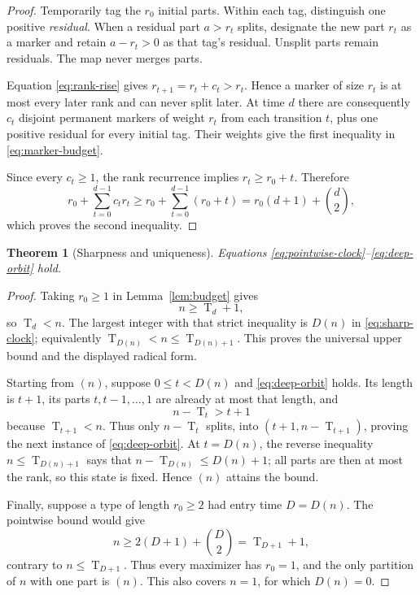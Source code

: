 \documentclass[10pt,a4paper]{amsart}
\newtheorem{theorem}{Theorem}[section]
\theoremstyle{definition}
\theoremstyle{remark}
\newcommand{\T}{\operatorname T}
\begin{document}
\begin{proof}
Temporarily tag the $r_0$ initial parts.  Within each tag, distinguish one
positive \emph{residual}.  When a residual part $a>r_t$ splits, designate
the new part $r_t$ as a marker and retain $a-r_t>0$ as that tag's residual.
Unsplit parts remain residuals.  The map never merges parts.

Equation \eqref{eq:rank-rise} gives
$r_{t+1}=r_t+c_t>r_t$.  Hence a marker of size $r_t$ is at most every later
rank and can never split later.  At time $d$ there are consequently $c_t$
disjoint permanent markers of weight $r_t$ from each transition $t$, plus
one positive residual for every initial tag.  Their weights give the first
inequality in \eqref{eq:marker-budget}.

Since every $c_t\geq1$, the rank recurrence implies $r_t\geq r_0+t$.
Therefore
\[
 r_0+\sum_{t=0}^{d-1}c_tr_t
 \geq r_0+\sum_{t=0}^{d-1}(r_0+t)
 =r_0(d+1)+\binom d2,
\]
which proves the second inequality.
\end{proof}

\begin{theorem}[Sharpness and uniqueness]\label{thm:clock}
Equations \eqref{eq:pointwise-clock}--\eqref{eq:deep-orbit} hold.
\end{theorem}

\begin{proof}
Taking $r_0\geq1$ in Lemma~\ref{lem:budget} gives
\[
                              n\geq\T_d+1,
\]
so $\T_d<n$.  The largest integer with that strict inequality is
$D(n)$ in \eqref{eq:sharp-clock}; equivalently
$\T_{D(n)}<n\leq\T_{D(n)+1}$.  This proves the universal upper bound and the
displayed radical form.

Starting from $(n)$, suppose $0\leq t<D(n)$ and
\eqref{eq:deep-orbit} holds.  Its length is $t+1$, its parts
$t,t-1,\ldots,1$ are already at most that length, and
\[
                         n-\T_t>t+1
\]
because $\T_{t+1}<n$.  Thus only $n-\T_t$ splits, into
$(t+1,n-\T_{t+1})$, proving the next instance of
\eqref{eq:deep-orbit}.  At $t=D(n)$, the reverse inequality
$n\leq\T_{D(n)+1}$ says that $n-\T_{D(n)}\leq D(n)+1$; all parts are then
at most the rank, so this state is fixed.  Hence $(n)$ attains the bound.

Finally, suppose a type of length $r_0\geq2$ had entry time $D=D(n)$.
The pointwise bound would give
\[
 n\geq2(D+1)+\binom D2=\T_{D+1}+1,
\]
contrary to $n\leq\T_{D+1}$.  Thus every maximizer has $r_0=1$, and the
only partition of $n$ with one part is $(n)$.  This also covers $n=1$, for
which $D(n)=0$.
\end{proof}
\end{document}
